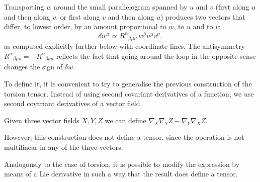 \begin{points}
\begin{carroll}
Transporting $w$ around the small parallelogram spanned by $u$ and $v$ (first along $u$ and then along $v$, or first along $v$ and then along $u$) produces two vectors that differ, to lowest order, by an amount proportional to $w$, to $u$ and to $v$:
\[
  \delta w^\alpha\propto R^\alpha{}_{\beta\mu\nu}\,w^\beta u^\mu v^\nu ,
\]
as computed explicitly further below with coordinate lines. The antisymmetry $R^\alpha{}_{\beta\mu\nu}=-R^\alpha{}_{\beta\nu\mu}$ reflects the fact that going around the loop in the opposite sense changes the sign of $\delta w$.
\begin{center}
\end{center}
\end{carroll}


\item To define it, it is convenient to try to generalise the previous construction of the torsion tensor. Instead of using second covariant derivatives of a function, we use second covariant derivatives of a vector field.

\item Given three vector fields $X,Y,Z$ we can define $\nabla_X\nabla_YZ-\nabla_Y\nabla_XZ$.

\item However, this construction does not define a tensor, since the operation is not multilinear in any of the three vectors.

\item Analogously to the case of torsion, it is possible to modify the expression by means of a Lie derivative in such a way that the result does define a tensor.


\end{points}
